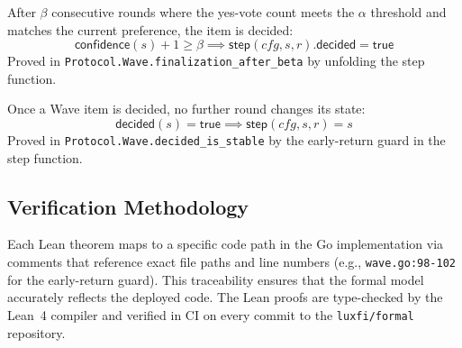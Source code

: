 \begin{theorem}
\label{thm:formal-finalization}
After $\beta$ consecutive rounds where the yes-vote count meets the $\alpha$ threshold and matches the current preference, the item is decided:
$$\mathsf{confidence}(s) + 1 \geq \beta \implies \mathsf{step}(\mathit{cfg}, s, r).\mathsf{decided} = \mathsf{true}$$
Proved in \texttt{Protocol.Wave.finalization\_after\_beta} by unfolding the step function.
\end{theorem}

\begin{theorem}
\label{thm:formal-stability}
Once a Wave item is decided, no further round changes its state:
$$\mathsf{decided}(s) = \mathsf{true} \implies \mathsf{step}(\mathit{cfg}, s, r) = s$$
Proved in \texttt{Protocol.Wave.decided\_is\_stable} by the early-return guard in the step function.
\end{theorem}

\subsection{Verification Methodology}

Each Lean theorem maps to a specific code path in the Go implementation via comments that reference exact file paths and line numbers (e.g., \texttt{wave.go:98-102} for the early-return guard). This traceability ensures that the formal model accurately reflects the deployed code. The Lean proofs are type-checked by the Lean~4 compiler and verified in CI on every commit to the \texttt{luxfi/formal} repository.

